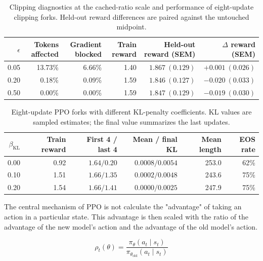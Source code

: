 \documentclass{article}
\begin{document}
\begin{table}[t]
    \centering
    \small
    \setlength{\tabcolsep}{4pt}
    \begin{tabular}{rrrrrr}
        \toprule
        $\epsilon$ & Tokens affected & Gradient blocked
        & Train reward & Held-out reward (SEM)
        & $\Delta$ reward (SEM) \\
        \midrule
        0.05 & 13.73\% & 6.66\% & 1.40
        & $1.867\ (0.129)$ & $+0.001\ (0.026)$ \\
        0.20 & 0.18\% & 0.09\% & 1.59
        & $1.846\ (0.127)$ & $-0.020\ (0.033)$ \\
        0.50 & 0.00\% & 0.00\% & 1.59
        & $1.847\ (0.129)$ & $-0.019\ (0.030)$ \\
        \bottomrule
    \end{tabular}
    \caption{Clipping diagnostics at the cached-ratio scale and
    performance of eight-update clipping forks. Held-out reward
    differences are paired against the untouched midpoint.}
    \label{tab:ppo-clipping}
\end{table}

\begin{table}[t]
    \centering
    \small
    \setlength{\tabcolsep}{4pt}
    \begin{tabular}{rrrrrr}
        \toprule
        $\beta_{\mathrm{KL}}$ & Train reward
        & First 4 / last 4 & Mean / final KL
        & Mean length & EOS rate \\
        \midrule
        0.00 & 0.92 & $1.64 / 0.20$ & $0.0008 / 0.0054$
        & 253.0 & 62\% \\
        0.10 & 1.51 & $1.66 / 1.35$ & $0.0002 / 0.0048$
        & 243.6 & 75\% \\
        0.20 & 1.54 & $1.66 / 1.41$ & $0.0000 / 0.0025$
        & 247.9 & 75\% \\
        \bottomrule
    \end{tabular}
    \caption{Eight-update PPO forks with different KL-penalty
    coefficients. KL values are sampled estimates; the final value
    summarizes the last updates.}
    \label{tab:ppo-kl}
\end{table}

The central mechanism of PPO is not calculate the "advantage" of taking an action in a particular state. This advantage is then scaled with the ratio of the
advantage of the new model's action and the advantage of the old model's action.

\[
\rho_t(\theta)=
\frac{\pi_\theta(a_t\mid s_t)}
{\pi_{\theta_{\mathrm{old}}}(a_t\mid s_t)}
\]
\end{document}
